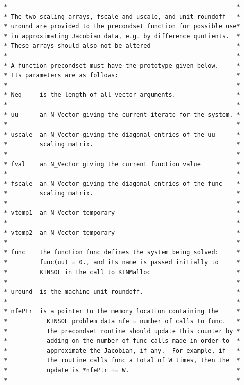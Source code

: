 \documentclass[11pt]{article}
\begin{document}
\begin{verbatim}
 *                                                                *
 * The two scaling arrays, fscale and uscale, and unit roundoff   *
 * uround are provided to the precondset function for possible use*
 * in approximating Jacobian data, e.g. by difference quotients.  *
 * These arrays should also not be altered                        *
 *                                                                *
 * A function precondset must have the prototype given below.     *
 * Its parameters are as follows:                                 *
 *                                                                *
 * Neq     is the length of all vector arguments.                 *
 *                                                                *
 * uu      an N_Vector giving the current iterate for the system. *
 *                                                                *
 * uscale  an N_Vector giving the diagonal entries of the uu-     *
 *         scaling matrix.                                        *
 *                                                                *
 * fval    an N_Vector giving the current function value          *
 *                                                                *
 * fscale  an N_Vector giving the diagonal entries of the func-   *
 *         scaling matrix.                                        *
 *                                                                *
 * vtemp1  an N_Vector temporary                                  *
 *                                                                *
 * vtemp2  an N_Vector temporary                                  *
 *                                                                *
 * func    the function func defines the system being solved:     *
 *         func(uu) = 0., and its name is passed initially to     *
 *         KINSOL in the call to KINMalloc                        *
 *                                                                *
 * uround  is the machine unit roundoff.                          *
 *                                                                *
 * nfePtr  is a pointer to the memory location containing the     *
 *           KINSOL problem data nfe = number of calls to func.   *
 *           The precondset routine should update this counter by *
 *           adding on the number of func calls made in order to  *
 *           approximate the Jacobian, if any.  For example, if   *
 *           the routine calls func a total of W times, then the  *
 *           update is *nfePtr += W.                              *
 *                                                                *

\end{verbatim}
\end{document}
